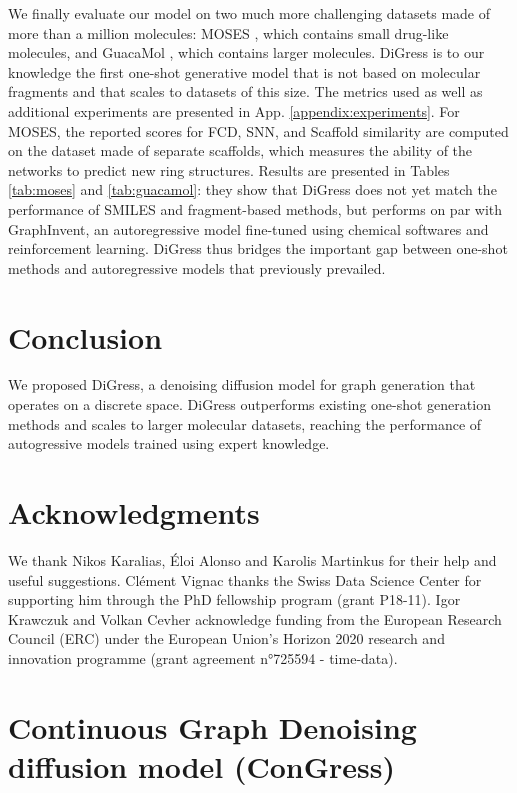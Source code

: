 \documentclass{article} %
\theoremstyle{plain}
\theoremstyle{definition}
\theoremstyle{remark}
\begin{document}
We finally evaluate our model on two much more challenging datasets made of more than a million molecules: MOSES \citep{polykovskiy2020molecular}, which contains small drug-like molecules, and GuacaMol \citep{brown2019guacamol}, which contains larger molecules. DiGress is to our knowledge the first one-shot generative model that is not based on molecular fragments and that scales to datasets of this size. The metrics used as well as additional experiments are presented in App. \ref{appendix:experiments}. For MOSES, the reported scores for FCD, SNN, and Scaffold similarity are computed on the dataset made of separate scaffolds, which measures the ability of the networks to predict new ring structures. Results are presented in Tables \ref{tab:moses} and \ref{tab:guacamol}: they show that DiGress does not yet match the performance of SMILES and fragment-based methods, but performs on par with GraphInvent, an autoregressive model fine-tuned using chemical softwares and reinforcement learning. DiGress thus bridges the important gap between one-shot methods and autoregressive models that previously prevailed.

\section{Conclusion}
We proposed DiGress, a denoising diffusion model for graph generation that operates on a discrete space. DiGress outperforms existing one-shot generation methods and scales to larger molecular datasets, reaching the performance of autogressive models trained using expert knowledge.



\section*{Acknowledgments}
We thank Nikos Karalias, Éloi Alonso and Karolis Martinkus for their help and useful suggestions.
Clément Vignac thanks the Swiss Data Science Center for supporting him through the PhD fellowship program (grant P18-11). Igor Krawczuk and Volkan Cevher acknowledge funding from the European Research Council (ERC) under the European Union’s Horizon 2020 research and innovation programme (grant agreement n°725594 - time-data).
\doclicenseThis




\appendix
\section{Continuous Graph Denoising diffusion model (ConGress)} \label{appendix:ConGress}
\end{document}
